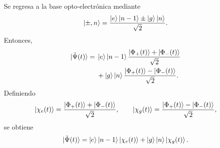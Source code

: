 Se regresa a la base opto-electr\'onica mediante
\begin{equation}
  \ket{\pm,n}
  =
  \frac{\ket e\ket{n-1}\pm\ket g\ket n}{\sqrt2}.
\end{equation}
Entonces,
\begin{equation}
\begin{aligned}
  \ket{\tilde\Psi(t)}
  ={}&
  \ket e\ket{n-1}
  \frac{\ket{\Phi_+(t)}+\ket{\Phi_-(t)}}{\sqrt2}
  \\
  &+
  \ket g\ket n
  \frac{\ket{\Phi_+(t)}-\ket{\Phi_-(t)}}{\sqrt2}.
\end{aligned}
\end{equation}
Definiendo
\begin{equation}
  \ket{\chi_e(t)}
  =
  \frac{\ket{\Phi_+(t)}+\ket{\Phi_-(t)}}{\sqrt2},
  \qquad
  \ket{\chi_g(t)}
  =
  \frac{\ket{\Phi_+(t)}-\ket{\Phi_-(t)}}{\sqrt2},
\end{equation}
se obtiene
\begin{equation}
  \ket{\tilde\Psi(t)}
  =
  \ket e\ket{n-1}\ket{\chi_e(t)}
  +
  \ket g\ket n\ket{\chi_g(t)}.
\end{equation}

